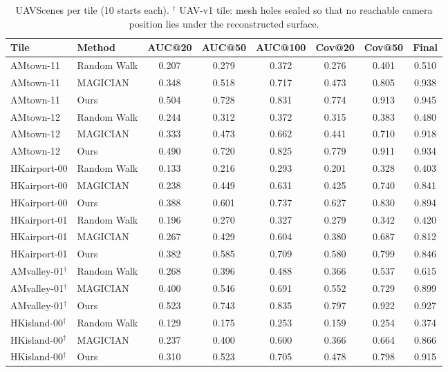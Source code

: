 \begin{table}[t]
\centering
\small
\begin{tabular}{llcccccc}
\toprule
Tile & Method & AUC@20 & AUC@50 & AUC@100 & Cov@20 & Cov@50 & Final \\
\midrule
AMtown-11 & Random Walk & 0.207 & 0.279 & 0.372 & 0.276 & 0.401 & 0.510 \\
AMtown-11 & MAGICIAN & 0.348 & 0.518 & 0.717 & 0.473 & 0.805 & 0.938 \\
AMtown-11 & Ours & 0.504 & 0.728 & 0.831 & 0.774 & 0.913 & 0.945 \\
\midrule
AMtown-12 & Random Walk & 0.244 & 0.312 & 0.372 & 0.315 & 0.383 & 0.480 \\
AMtown-12 & MAGICIAN & 0.333 & 0.473 & 0.662 & 0.441 & 0.710 & 0.918 \\
AMtown-12 & Ours & 0.490 & 0.720 & 0.825 & 0.779 & 0.911 & 0.934 \\
\midrule
HKairport-00 & Random Walk & 0.133 & 0.216 & 0.293 & 0.201 & 0.328 & 0.403 \\
HKairport-00 & MAGICIAN & 0.238 & 0.449 & 0.631 & 0.425 & 0.740 & 0.841 \\
HKairport-00 & Ours & 0.388 & 0.601 & 0.737 & 0.627 & 0.830 & 0.894 \\
\midrule
HKairport-01 & Random Walk & 0.196 & 0.270 & 0.327 & 0.279 & 0.342 & 0.420 \\
HKairport-01 & MAGICIAN & 0.267 & 0.429 & 0.604 & 0.380 & 0.687 & 0.812 \\
HKairport-01 & Ours & 0.382 & 0.585 & 0.709 & 0.580 & 0.799 & 0.846 \\
\midrule
AMvalley-01$^{\dagger}$ & Random Walk & 0.268 & 0.396 & 0.488 & 0.366 & 0.537 & 0.615 \\
AMvalley-01$^{\dagger}$ & MAGICIAN & 0.400 & 0.546 & 0.691 & 0.552 & 0.729 & 0.899 \\
AMvalley-01$^{\dagger}$ & Ours & 0.523 & 0.743 & 0.835 & 0.797 & 0.922 & 0.927 \\
\midrule
HKisland-00$^{\dagger}$ & Random Walk & 0.129 & 0.175 & 0.253 & 0.159 & 0.254 & 0.374 \\
HKisland-00$^{\dagger}$ & MAGICIAN & 0.237 & 0.400 & 0.600 & 0.366 & 0.664 & 0.866 \\
HKisland-00$^{\dagger}$ & Ours & 0.310 & 0.523 & 0.705 & 0.478 & 0.798 & 0.915 \\
\bottomrule
\end{tabular}
\caption{UAVScenes per tile (10 starts each). $^{\dagger}$ UAV-v1 tile: mesh holes sealed so that no reachable camera position lies under the reconstructed surface.}
\label{tab:uavscenes_tiles}
\end{table}
